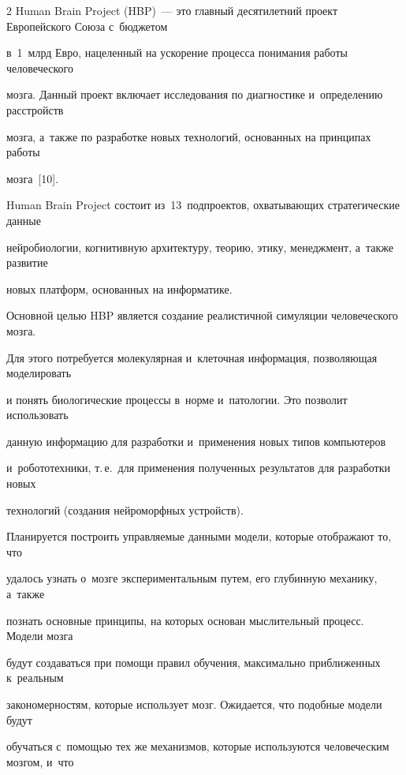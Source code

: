 \begin{multicols}{2}
  Human Brain Project (HBP)~--- это главный десятилетний проект Европейского Союза с~бюджетом 


  в~1~млрд Евро, нацеленный на ускорение процесса понимания работы человеческого 


мозга. Данный проект включает исследования по диагностике и~определению расстройств 


мозга, а~также по разработке новых технологий, основанных на принципах работы 


мозга~[10]. 


  


  Human Brain Project состоит из~13~подпроектов, охватывающих стратегические данные 


нейробиологии, когнитивную архитектуру, теорию, этику, менеджмент, а~так\-же развитие 


новых платформ, основанных на информатике.


  


    Основной целью HBP является создание реалистичной симуляции человеческого мозга. 


Для этого потребуется молекулярная и~клеточная информация, позволяющая моделировать 


и понять биологические процессы в~норме и~патологии. Это позволит использовать 


данную информацию для разработки и~применения новых типов компьютеров 


и~робототехники, т.\,е.\ для применения полученных результатов для разработки новых 


технологий (создания нейроморфных устройств). 





    Планируется построить управляемые данными модели, которые отображают то, что 


удалось узнать о~мозге экспериментальным путем, его глубинную механику, а~также 


познать основные принципы, на которых основан мыслительный процесс. Модели мозга 


будут создаваться при помощи правил обучения, максимально приближенных к~реальным 


закономерностям, которые использует мозг. Ожидается, что подобные модели будут 


обучаться с~помощью тех же механизмов, которые используются человеческим мозгом, и~что 



\end{multicols}

